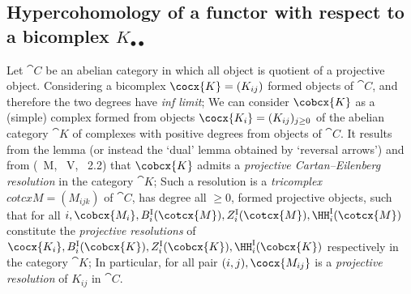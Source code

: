 \subsection{Hypercohomology of a functor with respect to a bicomplex $K_{\bullet\bullet}$}
\label{subsection:0.11.7}
\begin{env}[11.7.1]
Let $\cat{C}$ be an abelian category in which all object is quotient of a projective object.
Considering a bicomplex $\cocx{K} = (K_{ij})$ formed objects of $\cat{C}$, and therefore the two degrees have \emph{inf limit}; 
We can consider $\cobcx{K}$ as a (simple) complex formed from objects $\cocx{K_i} = (K_{ij})_{j\geq 0}$ of the abelian category $\cat{K}$ of complexes with positive degrees from objects of $\cat{C}$.
It results from the lemma  (or instead the `dual' lemma obtained by `reversal arrows') and from (~M, ~V, ~2.2) that $\cobcx{K}$ admits a \emph{projective Cartan--Eilenberg resolution} 
in the category $\cat{K}$; Such a resolution is a \emph{tricomplex} $cotcx{M} = (M_{ijk})$ of $\cat{C}$, has degree all $\geq 0$, formed projective objects, such that 
for all $i,\cobcx{M_i}, B_i^\text{I}(\cotcx{M}), Z_i^\text{I}(\cotcx{M}), \HH_i^\text{I}(\cotcx{M})$ constitute the \emph{projective resolutions} of 
$\cocx{K_i}, B_i^\text{I}(\cobcx{K}), Z_i^\text{I}(\cobcx{K}), \HH_i^\text{I}(\cobcx{K})$ respectively in the category $\cat{K}$; 
In particular, for all pair $(i,j), \cocx{M_{ij}}$ is a \emph{projective resolution} of $K_{ij}$ in $\cat{C}$.
\end{env}

